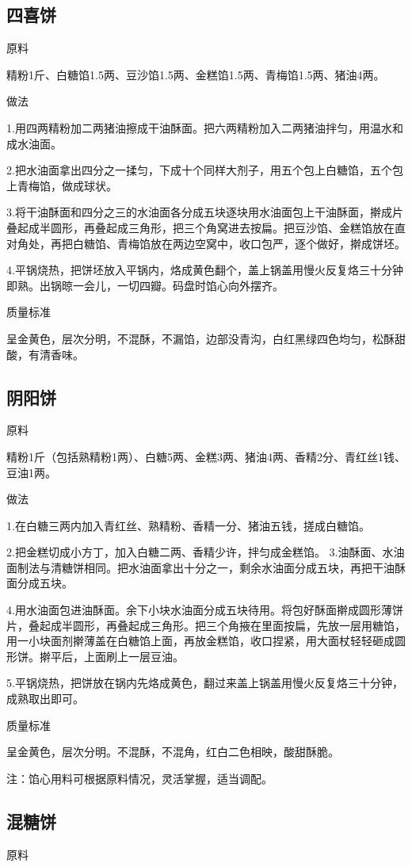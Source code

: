 \documentclass{ctexbook}
\begin{document}
\subsection{四喜饼}
原料

精粉1斤、白糖馅1.5两、豆沙馅1.5两、金糕馅1.5两、青梅馅1.5两、猪油4两。

做法

1.用四两精粉加二两猪油擦成干油酥面。把六两精粉加入二两猪油拌匀，用温水和成水油面。

2.把水油面拿出四分之一揉匀，下成十个同样大剂子，用五个包上白糖馅，五个包上青梅馅，做成球状。

3.将干油酥面和四分之三的水油面各分成五块逐块用水油面包上干油酥面，擀成片叠起成半圆形，再叠起成三角形，把三个角窝进去按扁。把豆沙馅、金糕馅放在直对角处，再把白糖馅、青梅馅放在两边空窝中，收口包严，逐个做好，擀成饼坯。

4.平锅烧热，把饼坯放入平锅内，烙成黄色翻个，盖上锅盖用慢火反复烙三十分钟即熟。出锅晾一会儿，一切四瓣。码盘时馅心向外摆齐。

质量标准

呈金黄色，层次分明，不混酥，不漏馅，边部没青沟，白红黑绿四色均匀，松酥甜酸，有清香味。
\subsection{阴阳饼}
原料

精粉1斤（包括熟精粉1两）、白糖5两、金糕3两、猪油4两、香精2分、青红丝1钱、豆油1两。

做法

1.在白糖三两内加入青红丝、熟精粉、香精一分、猪油五钱，搓成白糖馅。

2.把金糕切成小方丁，加入白糖二两、香精少许，拌匀成金糕馅。
3.油酥面、水油面制法与清糖饼相同。把水油面拿出十分之一，剩余水油面分成五块，再把干油酥面分成五块。

4.用水油面包进油酥面。余下小块水油面分成五块待用。将包好酥面擀成圆形薄饼片，叠起成半圆形，再叠起成三角形。把三个角掖在里面按扁，先放一层用糖馅，用一小块面剂擀薄盖在白糖馅上面，再放金糕馅，收口捏紧，用大面杖轻轻砸成圆形饼。擀平后，上面刷上一层豆油。

5.平锅烧热，把饼放在锅内先烙成黄色，翻过来盖上锅盖用慢火反复烙三十分钟，成熟取出即可。

质量标准

呈金黄色，层次分明。不混酥，不混角，红白二色相映，酸甜酥脆。

注：馅心用料可根据原料情况，灵活掌握，适当调配。
\subsection{混糖饼}
原料
\end{document}
